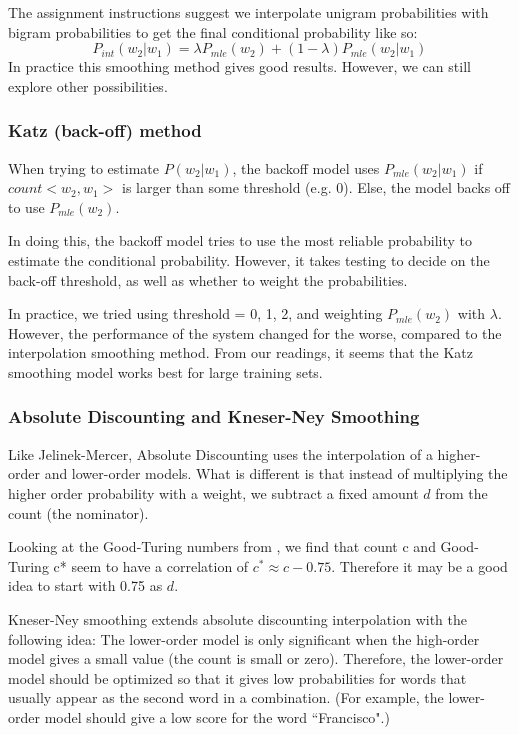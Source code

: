 \documentclass[10pt]{article}
\begin{document}
The assignment instructions suggest we interpolate unigram probabilities with bigram probabilities to get the final conditional probability like so:
\begin{equation}
P_{int}(w_2|w_1) = \lambda P_{mle}(w_2) + (1-\lambda)P_{mle}(w_2|w_1)
\end{equation}
In practice this smoothing method gives good results. However, we can still explore other possibilities.
\subsubsection{Katz (back-off) method}
When trying to estimate $P(w_2|w_1)$, the backoff model\cite{katz1987estimation} uses $P_{mle}(w_2|w_1)$ if $count<w_2,w_1>$ is larger than some threshold (e.g. 0). Else, the model backs off to use $P_{mle}(w_2)$.

In doing this, the backoff model tries to use the most reliable probability to estimate the conditional probability. However, it takes testing to decide on the back-off threshold, as well as whether to weight the probabilities.

In practice, we tried using threshold = 0, 1, 2, and weighting $P_{mle}(w_2)$ with $\lambda$. However, the performance of the system changed for the worse, compared to the interpolation smoothing method. From our readings, it seems that the Katz smoothing model works best for large training sets.
\subsubsection{Absolute Discounting and Kneser-Ney Smoothing}
Like Jelinek-Mercer, Absolute Discounting uses the interpolation of a higher-order and lower-order models. What is different is that instead of multiplying the higher order probability with a weight, we subtract a fixed amount $d$ from the count (the nominator). 

Looking at the Good-Turing numbers from \cite{church1991comparison}, we find that count c and Good-Turing c* seem to have a correlation of $c^*\approx c-0.75$. Therefore it may be a good idea to start with 0.75 as $d$.

Kneser-Ney smoothing extends absolute discounting interpolation with the following idea: The lower-order model is only significant when the high-order model gives a small value (the count is small or zero). Therefore, the lower-order model should be optimized so that it gives low probabilities for words that usually appear as the second word in a combination. (For example, the lower-order model should give a low score for the word ``Francisco".)
\end{document}
